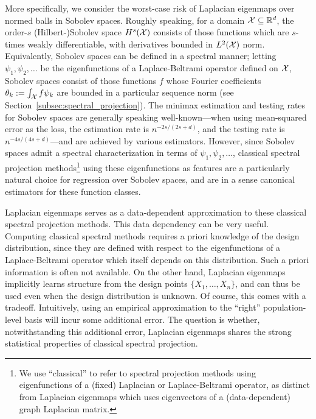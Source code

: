 More specifically, we consider the worst-case risk of Laplacian eigenmaps over normed balls in Sobolev spaces. Roughly speaking, for a domain $\mathcal{X} \subseteq \mathbb{R}^d$, the order-$s$ (Hilbert-)Sobolev space $H^s(\mathcal{X})$ consists of those functions which are $s$-times weakly differentiable, with derivatives bounded in $L^2(\mathcal{X})$ norm. Equivalently, Sobolev spaces can be defined in a spectral manner;  letting $\psi_1,\psi_2,\ldots$ be the eigenfunctions of a Laplace-Beltrami operator defined on $\mathcal{X}$, Sobolev spaces consist of those functions $f$ whose Fourier coefficients $\theta_k := \int_{\mathcal{X}} f \psi_k$ are bounded in a particular sequence norm (see Section~\ref{subsec:spectral_projection}). The minimax estimation and testing rates for Sobolev spaces are generally speaking well-known---when using mean-squared error as the loss, the estimation rate is $n^{-2s/(2s + d)}$, and the testing rate is $n^{-4s/(4s + d)}$---and are achieved by various estimators. However, since Sobolev spaces admit a spectral characterization in terms of $\psi_1,\psi_2,\ldots$, classical spectral projection methods\footnote{We use ``classical'' to refer to spectral projection methods using eigenfunctions of a (fixed) Laplacian or Laplace-Beltrami operator, as distinct from Laplacian eigenmaps which uses eigenvectors of a (data-dependent) graph Laplacian matrix.} using these eigenfunctions as features are a particularly natural choice for regression over Sobolev spaces, and are in a sense canonical estimators for these function classes. 

Laplacian eigenmaps serves as a data-dependent approximation to these classical spectral projection methods. This data dependency can be very useful. Computing classical spectral methods requires a priori knowledge of the design distribution, since they are defined with respect to the eigenfunctions of a Laplace-Beltrami operator which itself depends on this distribution. Such a priori information is often not available. On the other hand, Laplacian eigenmaps implicitly learns structure from the design points $\{X_1,\ldots,X_n\}$, and can thus be used even when the design distribution is unknown. Of course, this comes with a tradeoff. Intuitively, using an empirical approximation to the ``right'' population-level basis will incur some additional error. The question is whether, notwithstanding this additional error, Laplacian eigenmaps shares the strong statistical properties of classical spectral projection.

